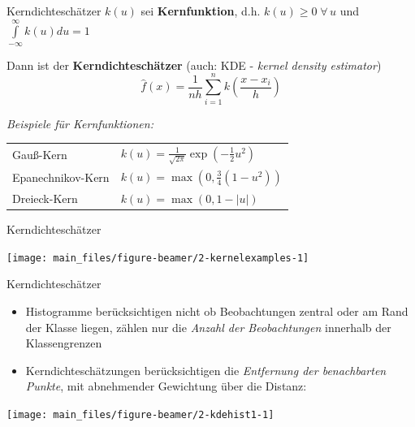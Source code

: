\documentclass[
  10pt,
  ignorenonframetext,
]{beamer}
\providecommand{\tightlist}{%
  \setlength{\itemsep}{0pt}\setlength{\parskip}{0pt}}
\begin{document}
\begin{frame}{Kerndichteschätzer}
\label{kerndichteschuxe4tzer}
\(k(u)\) sei \textbf{Kernfunktion}, d.h. \(k(u) \geq 0  \;\forall\, u\)
und \(\int\limits_{-\infty}^{\infty} k(u) du =1\)

Dann ist der \textbf{Kerndichteschätzer} (auch: KDE - \emph{kernel
density estimator}) \begin{equation*}
    \hat f (x) = \frac{1}{nh} \sum_{i=1}^n k\left(\frac{x-x_i}{h}\right)
\end{equation*}

\emph{Beispiele für Kernfunktionen:} \vspace{0.8em}

\begin{tabular}{ll}
Gauß-Kern & $k(u) = \frac{1}{\sqrt{2\pi}} \exp\left(-\frac{1}{2}u^2\right)$\\
Epanechnikov-Kern & $k(u) =  \max\left(0, \frac{3}{4}(1-u^2)\right)$\\
Dreieck-Kern & $k(u) = \max\left(0, 1 - |u|\right)$
\end{tabular}
\end{frame}

\begin{frame}{Kerndichteschätzer}
\label{kerndichteschuxe4tzer-1}
\scriptsize

\begin{center}\texttt{[image: main\_files/figure-beamer/2-kernelexamples-1]} \end{center}

\normalsize
\end{frame}

\begin{frame}{Kerndichteschätzer}
\label{kerndichteschuxe4tzer-2}
\begin{itemize}
\tightlist
\item
  Histogramme berücksichtigen nicht ob Beobachtungen zentral oder am
  Rand der Klasse liegen, zählen nur die \emph{Anzahl der Beobachtungen}
  innerhalb der Klassengrenzen
\item
  Kerndichteschätzungen berücksichtigen die \emph{Entfernung der
  benachbarten Punkte}, mit abnehmender Gewichtung über die Distanz:
\end{itemize}

\scriptsize

\begin{center}\texttt{[image: main\_files/figure-beamer/2-kdehist1-1]} \end{center}

\normalsize
\end{frame}
\end{document}
